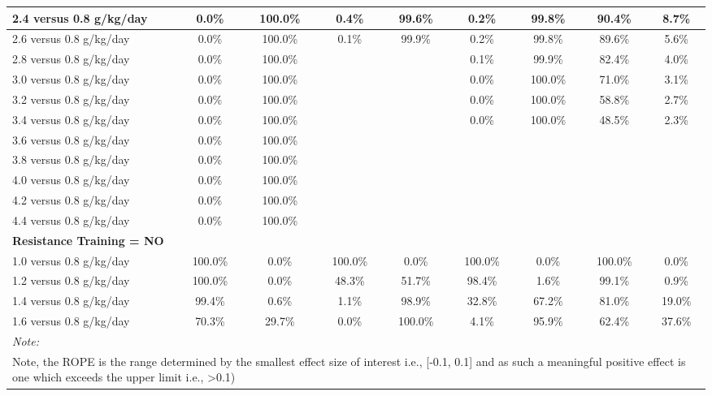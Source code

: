 \documentclass[
]{article}
\begin{document}
\begin{table}
{\begin{tabular}[t]{l|c|c|c|c|c|c|c|c}
\hline
\hspace{1em}2.4 versus 0.8 g/kg/day & 0.0\% & 100.0\% & 0.4\% & 99.6\% & 0.2\% & 99.8\% & 90.4\% & 8.7\%\\
\hline
\hspace{1em}2.6 versus 0.8 g/kg/day & 0.0\% & 100.0\% & 0.1\% & 99.9\% & 0.2\% & 99.8\% & 89.6\% & 5.6\%\\
\hline
\hspace{1em}2.8 versus 0.8 g/kg/day & 0.0\% & 100.0\% &  &  & 0.1\% & 99.9\% & 82.4\% & 4.0\%\\
\hline
\hspace{1em}3.0 versus 0.8 g/kg/day & 0.0\% & 100.0\% &  &  & 0.0\% & 100.0\% & 71.0\% & 3.1\%\\
\hline
\hspace{1em}3.2 versus 0.8 g/kg/day & 0.0\% & 100.0\% &  &  & 0.0\% & 100.0\% & 58.8\% & 2.7\%\\
\hline
\hspace{1em}3.4 versus 0.8 g/kg/day & 0.0\% & 100.0\% &  &  & 0.0\% & 100.0\% & 48.5\% & 2.3\%\\
\hline
\hspace{1em}3.6 versus 0.8 g/kg/day & 0.0\% & 100.0\% &  &  &  &  &  & \\
\hline
\hspace{1em}3.8 versus 0.8 g/kg/day & 0.0\% & 100.0\% &  &  &  &  &  & \\
\hline
\hspace{1em}4.0 versus 0.8 g/kg/day & 0.0\% & 100.0\% &  &  &  &  &  & \\
\hline
\hspace{1em}4.2 versus 0.8 g/kg/day & 0.0\% & 100.0\% &  &  &  &  &  & \\
\hline
\hspace{1em}4.4 versus 0.8 g/kg/day & 0.0\% & 100.0\% &  &  &  &  &  & \\
\hline
\multicolumn{9}{l}{\textbf{Resistance Training = NO}}\\
\hline
\hspace{1em}1.0 versus 0.8 g/kg/day & 100.0\% & 0.0\% & 100.0\% & 0.0\% & 100.0\% & 0.0\% & 100.0\% & 0.0\%\\
\hline
\hspace{1em}1.2 versus 0.8 g/kg/day & 100.0\% & 0.0\% & 48.3\% & 51.7\% & 98.4\% & 1.6\% & 99.1\% & 0.9\%\\
\hline
\hspace{1em}1.4 versus 0.8 g/kg/day & 99.4\% & 0.6\% & 1.1\% & 98.9\% & 32.8\% & 67.2\% & 81.0\% & 19.0\%\\
\hline
\hspace{1em}1.6 versus 0.8 g/kg/day & 70.3\% & 29.7\% & 0.0\% & 100.0\% & 4.1\% & 95.9\% & 62.4\% & 37.6\%\\
\hline
\multicolumn{9}{l}{\rule{0pt}{1em}\textit{Note: }}\\
\multicolumn{9}{l}{\rule{0pt}{1em}Note, the ROPE is the range determined by the smallest effect size of interest i.e., [-0.1, 0.1] and as such a meaningful positive effect is one which exceeds the upper limit i.e., >0.1)}\\
\end{tabular}

}
\end{table}
\end{document}
